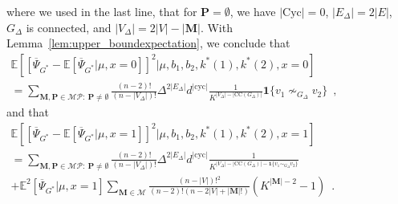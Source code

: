 \documentclass{article}
\begin{document}
where we used in the last line, that for $\mathbf{P}=\emptyset$, we have $|\mathrm{Cyc}|=0$, $|E_{\Delta}|=2|E|$, $G_{\Delta}$ is connected, and $|V_{\Delta}|=2|V|-|\mathbf{M}|$. 
With Lemma~\ref{lem:upper_boundexpectation}, we conclude that 
\begin{align*}
 \mathbb{E}\left[\left[\overline{\Psi}_{G^*} - \mathbb E[\overline{\Psi}_{G^*}|\mu,x=0]\right]^2 |\mu, b_1,b_2,k^*(1),k^*(2), x=0\right]\hspace{4cm}\\
 =  \sum_{\mathbf{M},\mathbf{P}\in \mathcal{MP}:~\mathbf{P} \neq \emptyset} \frac{(n-2)!}{(n-|V_{\Delta}|)!} \Delta^{2|E_{\Delta}|}d^{|\mathrm{cyc}|}\frac{1}{K^{|V_{\Delta}|-|\mathrm{CC}(G_{\Delta})|}}  \mathbf{1}\{v_1 \nsim_{G_\Delta} v_2\}\enspace , 
    \end{align*}
and that 
\begin{align*}
 \mathbb{E}\left[\left[\overline{\Psi}_{G^*} - \mathbb E[\overline{\Psi}_{G^*}|\mu,x=1]\right]^2 |\mu, b_1,b_2,k^*(1),k^*(2), x=1\right]\hspace{4cm}\\ =  \sum_{\mathbf{M},\mathbf{P}\in \mathcal{MP}:~\mathbf{P} \neq \emptyset} \frac{(n-2)!}{(n-|V_{\Delta}|)!} \Delta^{2|E_{\Delta}|}d^{|\mathrm{cyc}|}\frac{1}{K^{|V_{\Delta}|-|\mathrm{CC}(G_{\Delta})|-\mathbf{1}\{v_1 \sim_{G_\Delta} v_2\}}}  \\ + \mathbb E^2[\overline{\Psi}_{G^*}|\mu,x=1]   \sum_{\mathbf{M}\in  \mathcal{M} }   \frac{(n-|V|)!^2}{(n-2)!(n-2|V|+|\mathbf{M}|!) } \left(K^{|\mathbf{M}|- 2}-1\right)
 \enspace . 
\end{align*}
\end{document}
